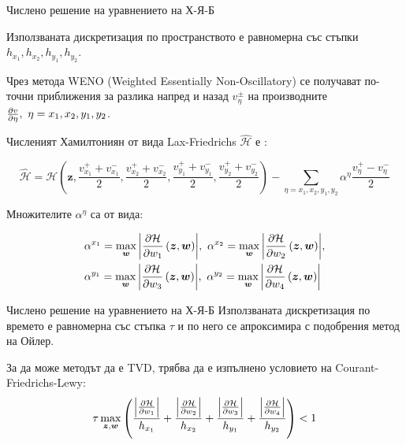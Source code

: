   \begin{frame}[t]{Числено решение на уравнението на Х-Я-Б}

Използваната дискретизация по пространството е равномерна със стъпки $h_{x_1}, h_{x_2}, h_{y_1}, h_{y_2}$.

Чрез метода WENO (Weighted Essentially Non-Oscillatory) се получават по-точни приближения за разлика напред и назад $v_{\eta}^{\pm}$ на производните $\pdv{v}{\eta},~ \eta = x_1, x_2, y_1, y_2$.

  Численият Хамилтониян от вида Lax-Friedrichs $\hat{\mathcal{H}}$ е :
  \begin{small}
    \begin{equation*}
      \hat{\mathcal{H}} = \mathcal{H}\left(\boldsymbol{z}, \frac{v_{x_1}^++v_{x_1}^-}{2}, \frac{v_{x_2}^++v_{x_2}^-}{2}, \frac{v_{y_1}^++v_{y_1}^-}{2}, \frac{v_{y_2}^++v_{y_2}^-}{2}\right) - \sum_{\eta = x_1, x_2, y_1, y_2} \alpha^{\eta} \frac{v_{\eta}^+-v_{\eta}^-}{2}
    \end{equation*}
  \end{small}
  Множителите $\alpha^{\eta}$ са от вида:
  \begin{small}
    \begin{equation*}
      \begin{split}
        &\alpha^{x_1} = \max_{\boldsymbol{w}} \abs{\pdv{\mathcal{H}}{w_1}\left(\boldsymbol{z}, \boldsymbol{w}\right)},~
        \alpha^{x_2} = \max_{\boldsymbol{w}} \abs{\pdv{\mathcal{H}}{w_2}\left(\boldsymbol{z}, \boldsymbol{w}\right)}, \\
        &\alpha^{y_1} = \max_{\boldsymbol{w}} \abs{\pdv{\mathcal{H}}{w_3}\left(\boldsymbol{z}, \boldsymbol{w}\right)},~
        \alpha^{y_2} = \max_{\boldsymbol{w}} \abs{\pdv{\mathcal{H}}{w_4}\left(\boldsymbol{z}, \boldsymbol{w}\right)}
      \end{split}
    \end{equation*}
  \end{small}
\end{frame}

\begin{frame}[c]{Числено решение на уравнението на Х-Я-Б}
  Използваната дискретизация по времето е равномерна със стъпка $\tau$ и по него се апроксимира с подобрения метод на Ойлер.

  За да може методът да е TVD, трябва да е изпълнено условието на Courant-Friedrichs-Lewy:
  \begin{equation*}
    \tau \max_{\boldsymbol{z}, \boldsymbol{w}} \left(\frac{\abs{\pdv{\mathcal{H}}{w_1}}}{h_{x_1}} + \frac{\abs{\pdv{\mathcal{H}}{w_2}}}{h_{x_2}} + \frac{\abs{\pdv{\mathcal{H}}{w_3}}}{h_{y_1}} + \frac{\abs{\pdv{\mathcal{H}}{w_4}}}{h_{y_2}}\right) < 1
  \end{equation*}
\end{frame}
